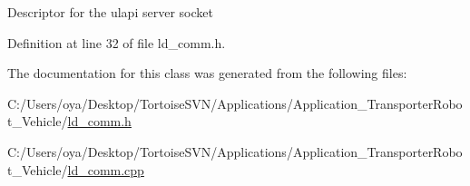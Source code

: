 Descriptor for the ulapi server socket 

Definition at line 32 of file ld\+\_\+comm.\+h.



The documentation for this class was generated from the following files\+:\begin{DoxyCompactItemize}
\item 
C\+:/\+Users/oya/\+Desktop/\+Tortoise\+S\+V\+N/\+Applications/\+Application\+\_\+\+Transporter\+Robot\+\_\+\+Vehicle/\mbox{\hyperlink{ld__comm_8h}{ld\+\_\+comm.\+h}}\item 
C\+:/\+Users/oya/\+Desktop/\+Tortoise\+S\+V\+N/\+Applications/\+Application\+\_\+\+Transporter\+Robot\+\_\+\+Vehicle/\mbox{\hyperlink{ld__comm_8cpp}{ld\+\_\+comm.\+cpp}}\end{DoxyCompactItemize}
